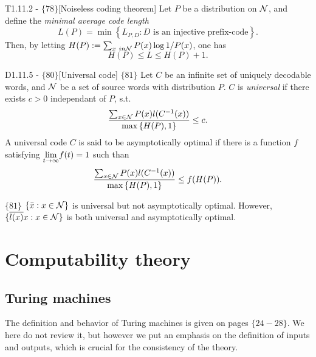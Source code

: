 \documentclass{article}
\begin{document}
\begin{flexitheorem}{T1.11.2 - $\{78\}$}[Noiseless coding theorem]
    Let $P$ be a distribution on $\mathcal{N}$, and define the \textit{minimal average code length} 
    \begin{equation}
        L(P) = \min \left\{ L_{P,D} : D \text{ is an injective prefix-code} \right\}.
    \end{equation}
    Then, by letting $H(P) := \sum_{x\ in \mathcal{N}} P(x) \log 1/P(x)$, one has
    \begin{equation}
        H(P) \leq L \leq H(P) + 1.
    \end{equation}
\end{flexitheorem}
\begin{flexidefinition}{D1.11.5 - $\{80\}$}[Universal code]
$\{81\}$ Let $C$ be an infinite set of uniquely decodable words, and $\mathcal{N}$ be a set of source words with distribution $P$. $C$ is \textit{universal} if there exists $c > 0$ independant of $P$, s.t.
\begin{equation}
    \frac{\sum_{x \in \mathcal{N}} P(x) l(C^{-1}(x))}{\max \left\{H(P),1 \right\}} \leq c.
\end{equation}
A universal code $C$ is said to be asymptotically optimal if there is a function $f$ satisfying $\underset{t \to \infty}{\lim} f(t) = 1$ such than
\begin{equation}
    \frac{\sum_{x \in \mathcal{N}} P(x) l(C^{-1}(x))}{\max \left\{H(P),1 \right\}} \leq f(H(P)).
\end{equation}
\end{flexidefinition}


$\{81\}$ $\{ \bar x : x \in \mathcal{N}\}$ is universal but not asymptotically optimal. However, $\{\overline{l(x)}x : x \in 
\mathcal{N} \}$ is both universal and asymptotically optimal.









\section{Computability theory}
\subsection{Turing machines}

The definition and behavior of Turing machines is given on pages $\{24-28\}$. We here do not review it, but however we put an emphasis on the definition of inputs and outputs, which is crucial for the consistency of the theory. 
\end{document}

